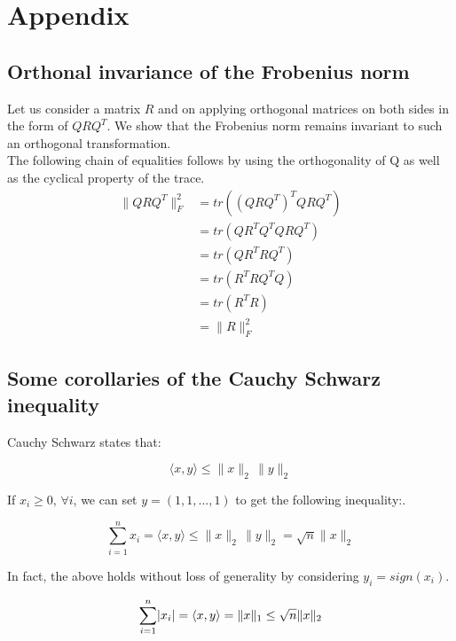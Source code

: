 \documentclass[paper=A4, fontsize=11pt]{scrartcl}
\let\originalleft\left
\let\originalright\right
\renewcommand{\left}{\mathopen{}\mathclose\bgroup\originalleft}
\renewcommand{\right}{\aftergroup\egroup\originalright}
\theoremstyle{remark}
\begin{document}
\clearpage



\section{Appendix}

\subsection{Orthonal invariance of the Frobenius norm}\label{sec:ortho}
Let us consider a matrix $R$ and on applying orthogonal matrices on both sides in the form of $QRQ^{T}$. We show that the Frobenius norm remains invariant to such an orthogonal transformation. \\

The following chain of equalities follows by using the orthogonality of
Q as well as the cyclical property of the trace.
\begin{equation}
\begin{aligned}
\|QRQ^{T} \|_{F}^{2}
& =  tr((QRQ^{T})^{T}QRQ^{T}) \\
& =  tr(QR^{T}Q^{T}QRQ^{T}) \\
& =  tr(QR^{T}RQ^{T}) \\
& =  tr(R^{T}RQ^{T}Q) \\
& =  tr(R^{T}R) \\
& =  \|R\|_{F}^{2} 
\end{aligned}
\end{equation}
	
\subsection{Some corollaries of the Cauchy Schwarz inequality} \label{sec:csi}

Cauchy Schwarz states that:

\begin{equation}
\langle x,y\rangle \leq \|x\|_{2} \, \|y\|_{2}
\end{equation}

If $x_i \geq 0, \, \forall i$, we can set $y= (1, 1, ..., 1)$ to get the following inequality:.

\begin{equation}
\sum_{i=1}^{n} x_{i} = \langle x,y\rangle  \leq  \|x\|_{2}\, \|y\|_{2} = \sqrt{n}\|x\|_{2}
\end{equation}

In fact, the above holds without loss of generality by considering $y_{i} = sign(x_{i})$. 

\begin{equation}
\sum_{i=1}^{n} \left|x_{i}\right| = \langle x,y\rangle =  \|x\|_{1}\leq \sqrt{n}\|x\|_{2}
\end{equation}	

\end{document}
